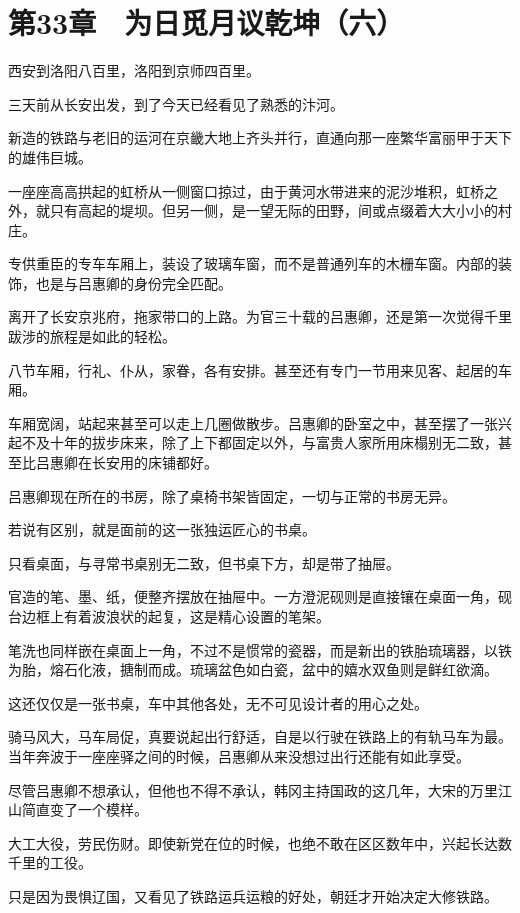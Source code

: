 \section{第33章　为日觅月议乾坤（六）}

西安到洛阳八百里，洛阳到京师四百里。

三天前从长安出发，到了今天已经看见了熟悉的汴河。

新造的铁路与老旧的运河在京畿大地上齐头并行，直通向那一座繁华富丽甲于天下的雄伟巨城。

一座座高高拱起的虹桥从一侧窗口掠过，由于黄河水带进来的泥沙堆积，虹桥之外，就只有高起的堤坝。但另一侧，是一望无际的田野，间或点缀着大大小小的村庄。

专供重臣的专车车厢上，装设了玻璃车窗，而不是普通列车的木栅车窗。内部的装饰，也是与吕惠卿的身份完全匹配。

离开了长安京兆府，拖家带口的上路。为官三十载的吕惠卿，还是第一次觉得千里跋涉的旅程是如此的轻松。

八节车厢，行礼、仆从，家眷，各有安排。甚至还有专门一节用来见客、起居的车厢。

车厢宽阔，站起来甚至可以走上几圈做散步。吕惠卿的卧室之中，甚至摆了一张兴起不及十年的拔步床来，除了上下都固定以外，与富贵人家所用床榻别无二致，甚至比吕惠卿在长安用的床铺都好。

吕惠卿现在所在的书房，除了桌椅书架皆固定，一切与正常的书房无异。

若说有区别，就是面前的这一张独运匠心的书桌。

只看桌面，与寻常书桌别无二致，但书桌下方，却是带了抽屉。

官造的笔、墨、纸，便整齐摆放在抽屉中。一方澄泥砚则是直接镶在桌面一角，砚台边框上有着波浪状的起复，这是精心设置的笔架。

笔洗也同样嵌在桌面上一角，不过不是惯常的瓷器，而是新出的铁胎琉璃器，以铁为胎，熔石化液，搪制而成。琉璃盆色如白瓷，盆中的嬉水双鱼则是鲜红欲滴。

这还仅仅是一张书桌，车中其他各处，无不可见设计者的用心之处。

骑马风大，马车局促，真要说起出行舒适，自是以行驶在铁路上的有轨马车为最。当年奔波于一座座驿之间的时候，吕惠卿从来没想过出行还能有如此享受。

尽管吕惠卿不想承认，但他也不得不承认，韩冈主持国政的这几年，大宋的万里江山简直变了一个模样。

大工大役，劳民伤财。即使新党在位的时候，也绝不敢在区区数年中，兴起长达数千里的工役。

只是因为畏惧辽国，又看见了铁路运兵运粮的好处，朝廷才开始决定大修铁路。

